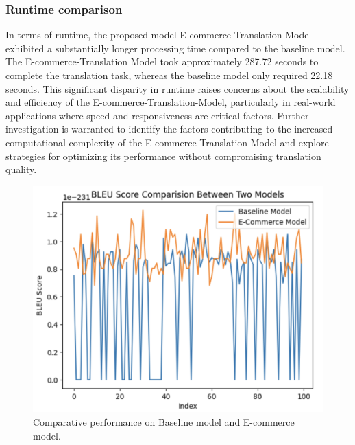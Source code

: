 \documentclass[sigconf]{acmart}
\begin{document}
\subsubsection{Runtime comparison}
In terms of runtime, the proposed model E-commerce-Translation-Model exhibited a substantially longer processing time compared to the baseline model. The E-commerce-Translation Model took approximately 287.72 seconds to complete the translation task, whereas the baseline model only required 22.18 seconds. This significant disparity in runtime raises concerns about the scalability and efficiency of the E-commerce-Translation-Model, particularly in real-world applications where speed and responsiveness are critical factors. Further investigation is warranted to identify the factors contributing to the increased computational complexity\cite{goldreich_2008} of the E-commerce-Translation-Model and explore strategies for optimizing its performance without compromising translation quality.


\begin{figure}[t]
\centering
\includegraphics[width=1.05\columnwidth]{Reports/Evaluation/Report/Evaluation/Images/res.png}
\caption{Comparative performance on Baseline model and E-commerce model.}
\end{figure}



 
\end{document}
